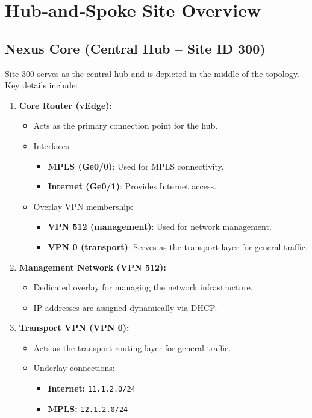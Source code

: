 \documentclass[12pt,english]{report}
\begin{document}
\section{Hub‑and‑Spoke Site Overview}
\subsection{Nexus Core (Central Hub – Site ID 300)}
Site 300 serves as the central hub and is depicted in the middle of the topology.
Key details include:
\begin{enumerate}
    \item \textbf{Core Router (vEdge):}
    \begin{itemize}
        \item Acts as the primary connection point for the hub.
        \item Interfaces:
        \begin{itemize}
            \item \textbf{MPLS (Ge0/0)}: Used for MPLS connectivity.
            \item \textbf{Internet (Ge0/1)}: Provides Internet access.
        \end{itemize}
        \item Overlay VPN membership:
        \begin{itemize}
            \item \textbf{VPN 512 (management)}: Used for network management.
            \item \textbf{VPN 0 (transport)}: Serves as the transport layer for general traffic.
        \end{itemize}
    \end{itemize}

    \item \textbf{Management Network (VPN 512):}
    \begin{itemize}
        \item Dedicated overlay for managing the network infrastructure.
        \item IP addresses are assigned dynamically via DHCP.
    \end{itemize}

    \item \textbf{Transport VPN (VPN 0):}
    \begin{itemize}
        \item Acts as the transport routing layer for general traffic.
        \item Underlay connections:
        \begin{itemize}
            \item \textbf{Internet:} \texttt{11.1.2.0/24}
            \item \textbf{MPLS:} \texttt{12.1.2.0/24}
        \end{itemize}
    \end{itemize}


\end{enumerate}
\end{document}
